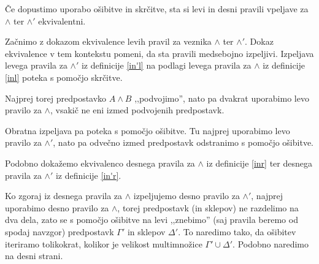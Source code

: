 \begin{lema}
    Če dopustimo uporabo ošibitve in skrčitve, sta si levi in desni pravili vpeljave za $\land$ ter $\land'$ ekvivalentni.
\end{lema}
\begin{dokaz}
    Začnimo z dokazom ekvivalence levih pravil za veznika $\land$ ter $\land'$. Dokaz ekvivalence v tem kontekstu pomeni, da sta pravili medsebojno izpeljivi.
    Izpeljava levega pravila za $\land'$ iz definicije \ref{in'l} na podlagi levega pravila za $\land$ iz definicije \ref{inl} poteka s pomočjo skrčitve.
    \begin{prooftree}
    \end{prooftree}
    Najprej torej predpostavko $A \land B$ ,,podvojimo'', nato pa dvakrat uporabimo levo pravilo za $\land$, vsakič ne eni izmed podvojenih predpostavk.

    Obratna izpeljava pa poteka s pomočjo ošibitve. Tu najprej uporabimo levo pravilo za $\land'$, nato pa odvečno izmed predpostavk odstranimo s pomočjo ošibitve.
    \begin{prooftree}
    \end{prooftree}

    Podobno dokažemo ekvivalenco desnega pravila za $\land$ iz definicije \ref{inr} ter desnega pravila za $\land'$ iz definicije \ref{in'r}.
    \begin{prooftree}


    \end{prooftree}
    Ko zgoraj iz desnega pravila za $\land$ izpeljujemo desno pravilo za $\land'$, najprej uporabimo desno pravilo za $\land$, torej predpostavk (in sklepov) ne razdelimo na dva dela, zato se s pomočjo ošibitve na levi ,,znebimo'' (saj pravila beremo od spodaj navzgor) predpostavk $\Gamma'$ in sklepov $\Delta'$. To naredimo tako, da ošibitev iteriramo tolikokrat, kolikor je velikost multimnožice $\Gamma'\cup\Delta'$. Podobno naredimo na desni strani.


\end{dokaz}
